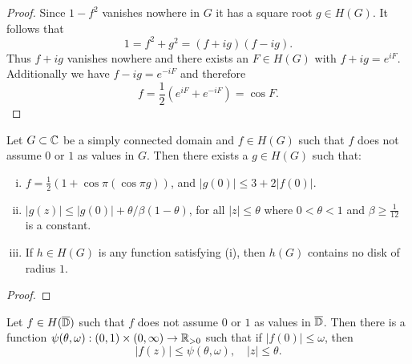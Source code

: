 \begin{proof}
    Since $1 - f^2$ vanishes nowhere in $G$ it has a square root $g \in H(G)$. It follows that
    $$ 1 = f^2 + g^2 = (f + ig)(f - ig). $$
    Thus $f + ig$ vanishes nowhere and there exists an $F \in H(G)$ with $f + ig = e^{iF}$. Additionally we have $f - ig = e^{-iF}$ and therefore
    $$ f = {\textstyle \frac{1}{2}} (e^{iF} + e^{-iF}) = \cos F. $$
\end{proof}

\begin{proposition} \label{prop:schottky-3}
    Let $G \subset \mathbb{C}$ be a simply connected domain and $f \in H(G)$ such that $f$ does not assume $0$ or $1$ as values in $G$. Then there exists a $g \in H(G)$ such that:
    \begin{enumerate}[i.]
        \item $f = \frac{1}{2} ( 1 + \cos \pi (\cos \pi g))$, and $\vert g(0) \vert \leq 3 + 2 \vert f(0) \vert$.
        \item $\vert g(z) \vert \leq \vert g(0) \vert + \theta / \beta (1 - \theta)$, for all $\vert z \vert \leq \theta$ where $0 < \theta < 1$ and $\beta \geq \frac{1}{12}$ is a constant.
        \item If $h \in H(G)$ is any function satisfying (i), then $h(G)$ contains no disk of radius $1$.
    \end{enumerate}
\end{proposition}

\begin{proof}
\end{proof}

\begin{theorem}[Schottky] \label{thm:schottky}
    Let $f \in H(\overline{\mathbb{D}})$ such that $f$ does not assume $0$ or $1$ as values in $\overline{\mathbb{D}}$. Then there is a function $\psi(\theta, \omega) : (0, 1) \times (0, \infty) \to \mathbb{R}_{>0}$ such that if $\vert f(0) \vert \leq \omega$, then
    \begin{equation}
        \vert f(z) \vert \leq \psi(\theta, \omega), \quad \vert z \vert \leq \theta.
    \end{equation}
\end{theorem}

